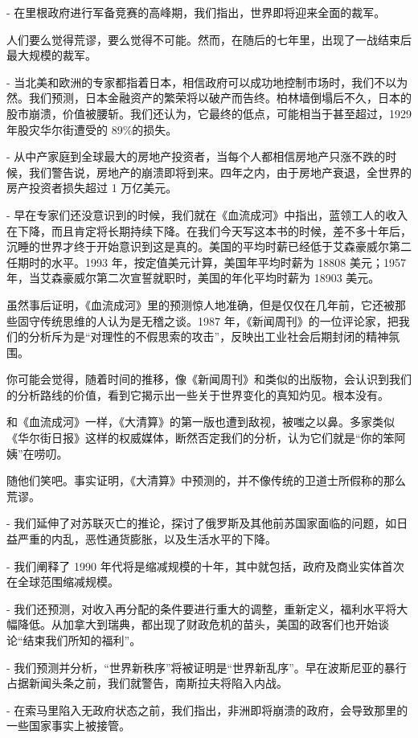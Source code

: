 - 在里根政府进行军备竞赛的高峰期，我们指出，世界即将迎来全面的裁军。


人们要么觉得荒谬，要么觉得不可能。然而，在随后的七年里，出现了一战结束后最大规模的裁军。


- 当北美和欧洲的专家都指着日本，相信政府可以成功地控制市场时，我们不以为然。我们预测，日本金融资产的繁荣将以破产而告终。柏林墙倒塌后不久，日本的股市崩溃，价值被腰斩。我们还认为，它最终的低点，可能相当于甚至超过，1929 年股灾华尔街遭受的 89\%的损失。


- 从中产家庭到全球最大的房地产投资者，当每个人都相信房地产只涨不跌的时候，我们警告说，房地产的崩溃即将到来。四年之内，由于房地产衰退，全世界的房产投资者损失超过 1 万亿美元。


- 早在专家们还没意识到的时候，我们就在《血流成河》中指出，蓝领工人的收入在下降，而且肯定将长期持续下降。在我们今天写这本书的时候，差不多十年后，沉睡的世界才终于开始意识到这是真的。美国的平均时薪已经低于艾森豪威尔第二任期时的水平。1993 年，按定值美元计算，美国年平均时薪为 18808 美元；1957 年，当艾森豪威尔第二次宣誓就职时，美国的年化平均时薪为 18903 美元。


虽然事后证明，《血流成河》里的预测惊人地准确，但是仅仅在几年前，它还被那些固守传统思维的人认为是无稽之谈。1987 年，《新闻周刊》的一位评论家，把我们的分析斥为是“对理性的不假思索的攻击”，反映出工业社会后期封闭的精神氛围。


你可能会觉得，随着时间的推移，像《新闻周刊》和类似的出版物，会认识到我们的分析路线的价值，看到它揭示出一些关于世界变化的真知灼见。根本没有。


和《血流成河》一样，《大清算》的第一版也遭到敌视，被嗤之以鼻。多家类似《华尔街日报》这样的权威媒体，断然否定我们的分析，认为它们就是“你的笨阿姨”在唠叨。


随他们笑吧。事实证明，《大清算》中预测的，并不像传统的卫道士所假称的那么荒谬。


- 我们延伸了对苏联灭亡的推论，探讨了俄罗斯及其他前苏国家面临的问题，如日益严重的内乱，恶性通货膨胀，以及生活水平的下降。


- 我们阐释了 1990 年代将是缩减规模的十年，其中就包括，政府及商业实体首次在全球范围缩减规模。


- 我们还预测，对收入再分配的条件要进行重大的调整，重新定义，福利水平将大幅降低。从加拿大到瑞典，都出现了财政危机的苗头，美国的政客们也开始谈论“结束我们所知的福利”。


- 我们预测并分析，“世界新秩序”将被证明是“世界新乱序”。早在波斯尼亚的暴行占据新闻头条之前，我们就警告，南斯拉夫将陷入内战。


- 在索马里陷入无政府状态之前，我们指出，非洲即将崩溃的政府，会导致那里的一些国家事实上被接管。


